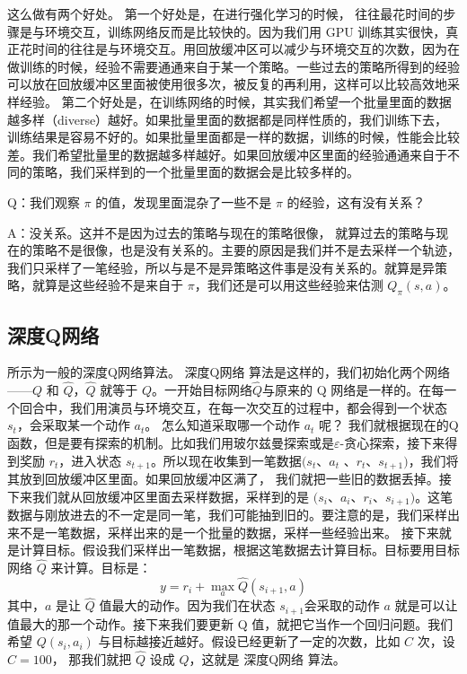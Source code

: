 这么做有两个好处。
第一个好处是，在进行强化学习的时候， 往往最花时间的步骤是与环境交互，训练网络反而是比较快的。因为我们用 GPU 训练其实很快，真正花时间的往往是与环境交互。用回放缓冲区可以减少与环境交互的次数，因为在做训练的时候，经验不需要通通来自于某一个策略。一些过去的策略所得到的经验可以放在回放缓冲区里面被使用很多次，被反复的再利用，这样可以比较高效地采样经验。
第二个好处是，在训练网络的时候，其实我们希望一个批量里面的数据越多样（diverse）越好。如果批量里面的数据都是同样性质的，我们训练下去，训练结果是容易不好的。如果批量里面都是一样的数据，训练的时候，性能会比较差。我们希望批量里的数据越多样越好。如果回放缓冲区里面的经验通通来自于不同的策略，我们采样到的一个批量里面的数据会是比较多样的。

Q：我们观察 $\pi$ 的值，发现里面混杂了一些不是 $\pi$ 的经验，这有没有关系？

A：没关系。这并不是因为过去的策略与现在的策略很像， 就算过去的策略与现在的策略不是很像，也是没有关系的。主要的原因是我们并不是去采样一个轨迹，我们只采样了一笔经验，所以与是不是异策略这件事是没有关系的。就算是异策略，就算是这些经验不是来自于 $\pi$，我们还是可以用这些经验来估测 $Q_{\pi}(s,a)$。

\subsection{深度Q网络} 

 所示为一般的深度Q网络算法。
深度Q网络 算法是这样的，我们初始化两个网络------$Q$ 和 $\hat{Q}$，$\hat{Q}$ 就等于 $Q$。一开始目标网络$\hat{Q}$与原来的 Q 网络是一样的。在每一个回合中，我们用演员与环境交互，在每一次交互的过程中，都会得到一个状态 $s_t$，会采取某一个动作 $a_t$。
怎么知道采取哪一个动作 $a_t$ 呢？
我们就根据现在的Q函数，但是要有探索的机制。比如我们用玻尔兹曼探索或是$\varepsilon$-贪心探索，接下来得到奖励 $r_t$，进入状态 $s_{t+1}$。所以现在收集到一笔数据$(s_t$、$a_t$ 、$r_t$、$s_{t+1})$，我们将其放到回放缓冲区里面。如果回放缓冲区满了， 我们就把一些旧的数据丢掉。接下来我们就从回放缓冲区里面去采样数据，采样到的是 $(s_{i}$、$a_{i}$、$r_{i}$、$s_{i+1})$。这笔数据与刚放进去的不一定是同一笔，我们可能抽到旧的。要注意的是，我们采样出来不是一笔数据，采样出来的是一个批量的数据，采样一些经验出来。
接下来就是计算目标。假设我们采样出一笔数据，根据这笔数据去计算目标。目标要用目标网络 $\hat{Q}$ 来计算。目标是：
\begin{equation}
    \label{eq:}
    y=r_{i}+\max _{a} \hat{Q}\left(s_{i+1}, a\right)
\end{equation}
其中，$a$ 是让 $\hat{Q}$ 值最大的动作。因为我们在状态 $s_{i+1}$会采取的动作 $a$ 就是可以让 值最大的那一个动作。接下来我们要更新 Q 值，就把它当作一个回归问题。我们希望 $Q(s_i,a_i)$  与目标越接近越好。假设已经更新了一定的次数，比如 $C$ 次，设 $C = 100$， 那我们就把 $\hat{Q}$ 设成 $Q$，这就是 深度Q网络 算法。

